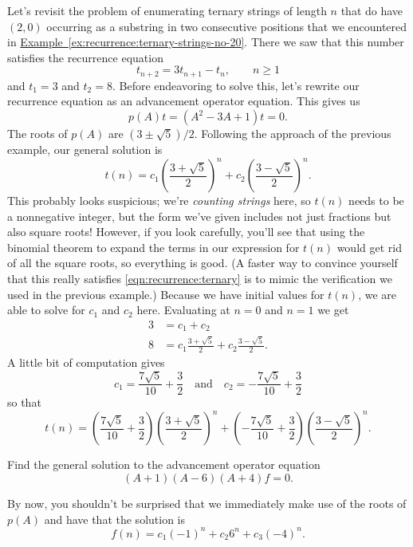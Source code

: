 \begin{example}\label{ex:recurrence:ternary-strings-no-20-solved}
  Let's revisit the problem of enumerating ternary strings of length
  $n$ that do have $(2,0)$ occurring as a substring in two consecutive
  positions that we encountered in
  \hyperref[ex:recurrence:ternary-strings-no-20]{Example~\ref*{ex:recurrence:ternary-strings-no-20}}. There
  we saw that this number satisfies the recurrence equation
  \[t_{n+2} = 3t_{n+1} - t_n,\qquad n\geq 1\]
  and $t_1 = 3$ and $t_2=8$. Before endeavoring to solve this, let's
  rewrite our recurrence equation as an advancement operator
  equation. This gives us
  \begin{equation}
    \label{eqn:recurrence:ternary}
    p(A)t=(A^2-3A+1)t=0.
  \end{equation}
  The roots of $p(A)$ are $(3\pm\sqrt{5})/2$. Following the approach
  of the previous example, our general solution is
  \[t(n) = c_1\left(\frac{3+\sqrt{5}}{2}\right)^n +
  c_2\left(\frac{3-\sqrt{5}}{2}\right)^n.\]
  This probably looks suspicious; we're \emph{counting strings} here,
  so $t(n)$ needs to be a nonnegative integer, but the form we've
  given includes not just fractions but also square roots! However,
  if you look carefully, you'll see that using the binomial theorem to
  expand the terms in our expression for $t(n)$ would get rid of all
  the square roots, so everything is good. (A faster way to convince
  yourself that this really satisfies \autoref{eqn:recurrence:ternary}
  is to mimic the verification we used in the previous example.)
  Because we have initial values for $t(n)$, we are able to solve for
  $c_1$ and $c_2$ here. Evaluating at $n=0$ and $n=1$ we get
  \begin{align*}
    3 &= c_1 + c_2\\
    8 & = c_1\frac{3+\sqrt{5}}{2} + c_2 \frac{3-\sqrt{5}}{2}.
  \end{align*}
  A little bit of computation gives
  \[c_1 = \frac{7\sqrt{5}}{10} + \frac{3}{2} \quad\text{and}\quad c_2 =
  -\frac{7\sqrt{5}}{10} +\frac{3}{2}\]
  so that
  \[t(n) = \left(\frac{7\sqrt{5}}{10} + \frac{3}{2}\right)
  \left(\frac{3+\sqrt{5}}{2}\right)^n+ \left(-\frac{7\sqrt{5}}{10}
    +\frac{3}{2}\right) \left(\frac{3-\sqrt{5}}{2}\right)^n.\]
\end{example}

\begin{example}
  Find the general solution to the advancement operator equation
  \[(A+1)(A-6)(A+4)f = 0.\]
  
  By now, you shouldn't be surprised that we immediately make use of
  the roots of $p(A)$ and have that the solution is
  \[f(n) = c_1(-1)^n + c_2 6^n + c_3 (-4)^n.\]
\end{example}

